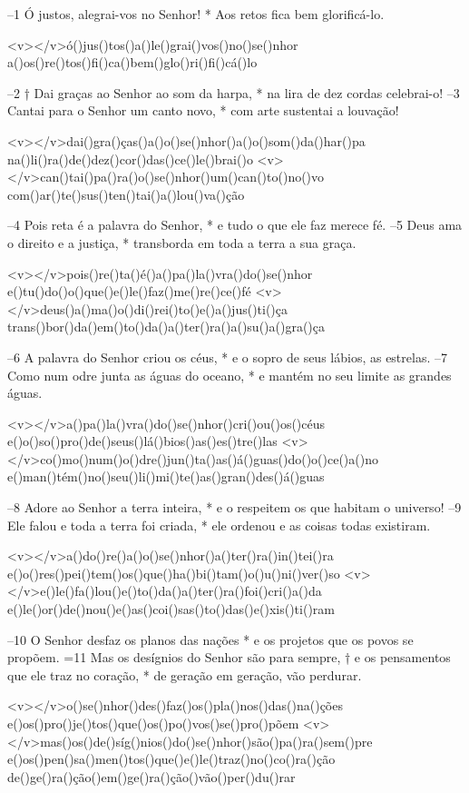 –1 Ó justos, alegrai-vos no Senhor! *
Aos retos fica bem glorificá-lo.


<v></v>ó()jus()tos()a()le()grai()vos()no()se()nhor
a()os()re()tos()fi()ca()bem()glo()ri()fi()cá()lo

–2 † Dai graças ao Senhor ao som da harpa, *
na lira de dez cordas celebrai-o!
–3 Cantai para o Senhor um canto novo, *
com arte sustentai a louvação!

<v></v>dai()gra()ças()a()o()se()nhor()a()o()som()da()har()pa
na()li()ra()de()dez()cor()das()ce()le()brai()o
<v></v>can()tai()pa()ra()o()se()nhor()um()can()to()no()vo
com()ar()te()sus()ten()tai()a()lou()va()ção

–4 Pois reta é a palavra do Senhor, *
e tudo o que ele faz merece fé.
–5 Deus ama o direito e a justiça, *
transborda em toda a terra a sua graça.

<v></v>pois()re()ta()é()a()pa()la()vra()do()se()nhor
e()tu()do()o()que()e()le()faz()me()re()ce()fé
<v></v>deus()a()ma()o()di()rei()to()e()a()jus()ti()ça
trans()bor()da()em()to()da()a()ter()ra()a()su()a()gra()ça

–6 A palavra do Senhor criou os céus, *
e o sopro de seus lábios, as estrelas.
–7 Como num odre junta as águas do oceano, *
e mantém no seu limite as grandes águas.

<v></v>a()pa()la()vra()do()se()nhor()cri()ou()os()céus
e()o()so()pro()de()seus()lá()bios()as()es()tre()las
<v></v>co()mo()num()o()dre()jun()ta()as()á()guas()do()o()ce()a()no
e()man()tém()no()seu()li()mi()te()as()gran()des()á()guas

–8 Adore ao Senhor a terra inteira, *
e o respeitem os que habitam o universo!
–9 Ele falou e toda a terra foi criada, *
ele ordenou e as coisas todas existiram.

<v></v>a()do()re()a()o()se()nhor()a()ter()ra()in()tei()ra
e()o()res()pei()tem()os()que()ha()bi()tam()o()u()ni()ver()so
<v></v>e()le()fa()lou()e()to()da()a()ter()ra()foi()cri()a()da
e()le()or()de()nou()e()as()coi()sas()to()das()e()xis()ti()ram

–10 O Senhor desfaz os planos das nações *
e os projetos que os povos se propõem.
=11 Mas os desígnios do Senhor são para sempre, †
e os pensamentos que ele traz no coração, *
de geração em geração, vão perdurar.

<v></v>o()se()nhor()des()faz()os()pla()nos()das()na()ções
e()os()pro()je()tos()que()os()po()vos()se()pro()põem
<v></v>mas()os()de()síg()nios()do()se()nhor()são()pa()ra()sem()pre
e()os()pen()sa()men()tos()que()e()le()traz()no()co()ra()ção
de()ge()ra()ção()em()ge()ra()ção()vão()per()du()rar

